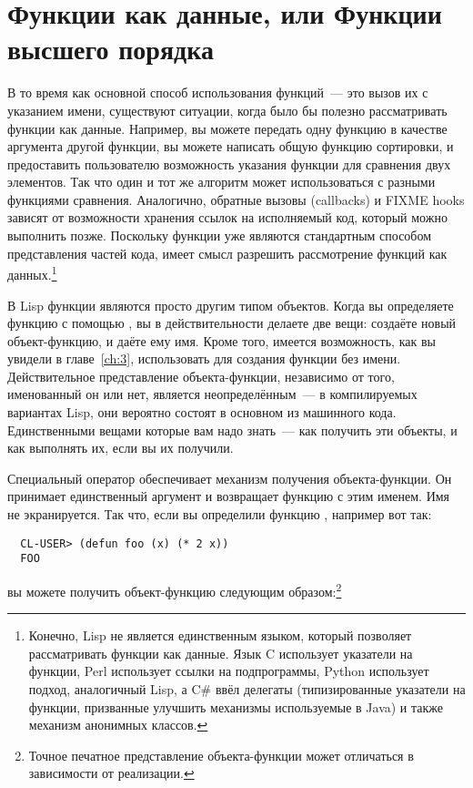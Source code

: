 \section{Функции как данные, или Функции высшего порядка}

В то время как основной способ использования функций~--- это вызов их с указанием имени,
существуют ситуации, когда было бы полезно рассматривать функции как данные.  Например, вы
можете передать одну функцию в качестве аргумента другой функции, вы можете написать общую
функцию сортировки, и предоставить пользователю возможность указания функции для сравнения
двух элементов.  Так что один и тот же алгоритм может использоваться с разными функциями
сравнения.  Аналогично, обратные вызовы (callbacks) и FIXME hooks зависят от возможности
хранения ссылок на исполняемый код, который можно выполнить позже.  Поскольку функции уже
являются стандартным способом представления частей кода, имеет смысл разрешить
рассмотрение функций как данных.\footnote{Конечно, Lisp не является единственным языком,
  который позволяет рассматривать функции как данные.  Язык C использует указатели на
  функции, Perl использует ссылки на подпрограммы, Python использует подход, аналогичный
  Lisp, а C\# ввёл делегаты (типизированные указатели на функции, призванные улучшить
  механизмы используемые в Java) и также механизм анонимных классов.}

В Lisp функции являются просто другим типом объектов.  Когда вы определяете функцию с
помощью , вы в действительности делаете две вещи: создаёте новый
объект-функцию, и даёте ему имя.  Кроме того, имеется возможность, как вы
увидели в главе~\ref{ch:3}, использовать  для создания функции без
имени.  Действительное
представление объекта-функции, независимо от того, именованный он или нет, является
неопределённым~--- в компилируемых вариантах Lisp, они вероятно состоят в основном из
машинного кода.  Единственными вещами которые вам надо знать~--- как получить эти объекты,
и как выполнять их, если вы их получили.

Специальный оператор  обеспечивает механизм получения объекта-функции.  Он
принимает единственный аргумент и возвращает функцию с этим именем.  Имя не экранируется.
Так что, если вы определили функцию , например вот так:

\begin{verbatim}
  CL-USER> (defun foo (x) (* 2 x))
  FOO
\end{verbatim}

вы можете получить объект-функцию следующим образом:\footnote{Точное печатное
  представление объекта-функции может отличаться в зависимости от реализации.}

